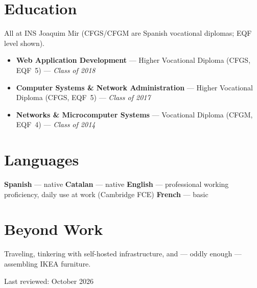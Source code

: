 \documentclass[10pt,a4paper]{article}
\newcommand{\reviewdate}{October 2026}         %
\begin{document}
\section*{Education}
\begingroup\raggedright
\noindent All at INS Joaquim Mir (CFGS/CFGM are Spanish vocational diplomas; EQF level shown).
\begin{itemize}
  \item \textbf{Web Application Development} --- Higher Vocational Diploma (CFGS, EQF~5)
  --- \textit{Class of 2018}
  \item \textbf{Computer Systems \& Network Administration} --- Higher Vocational Diploma
  (CFGS, EQF~5) --- \textit{Class of 2017}
  \item \textbf{Networks \& Microcomputer Systems} --- Vocational Diploma (CFGM, EQF~4)
  --- \textit{Class of 2014}
\end{itemize}
\endgroup

\section*{Languages}
\textbf{Spanish} --- native \quad \textcolor{muted}{\textbullet} \quad
\textbf{Catalan} --- native \quad \textcolor{muted}{\textbullet} \quad
\textbf{English} --- professional working proficiency, daily use at work (Cambridge FCE)
\quad \textcolor{muted}{\textbullet} \quad \textbf{French} --- basic

\section*{Beyond Work}
Traveling, tinkering with self-hosted infrastructure, and --- oddly enough --- assembling IKEA
furniture.

\vspace{0.6em}
{\footnotesize\color{muted}Last reviewed: \reviewdate}
\end{document}
